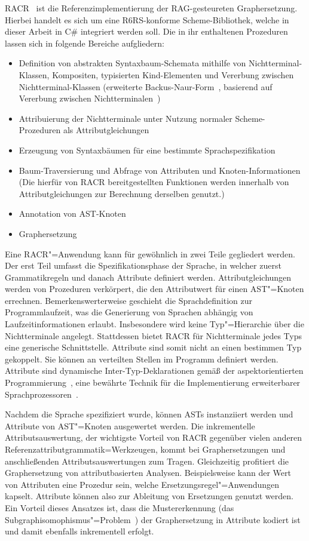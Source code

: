 RACR~\cite{Buerger2012} ist die Referenzimplementierung der RAG-gesteureten Graphersetzung. Hierbei handelt es sich um eine R6RS-konforme Scheme-Bibliothek, welche in dieser Arbeit in C\# integriert werden soll. Die in ihr enthaltenen Prozeduren lassen sich in folgende Bereiche aufgliedern:
\begin{itemize}
	\item Definition von abstrakten Syntaxbaum-Schemata mithilfe von Nichtterminal-Klassen, Kompositen, typisierten Kind-Elementen und Vererbung zwischen Nichtterminal-Klassen (erweiterte Backus-Naur-Form~\cite{Scowen1998}, basierend auf Vererbung zwischen Nichtterminalen~\cite{Hedin1989})
	\item Attribuierung der Nichtterminale unter Nutzung normaler Scheme-Prozeduren als Attributgleichungen
	\item Erzeugung von Syntaxbäumen für eine bestimmte Sprachspezifikation
	\item Baum-Traversierung und Abfrage von Attributen und Knoten-Informationen (Die hierfür von RACR bereitgestellten Funktionen werden innerhalb von Attributgleichungen zur Berechnung derselben genutzt.)
	\item Annotation von AST-Knoten
	\item Graphersetzung
\end{itemize}

Eine RACR"=Anwendung kann für gewöhnlich in zwei Teile gegliedert werden. Der erst Teil umfasst die Spezifikationsphase der Sprache, in welcher zuerst Grammatikregeln und danach Attribute definiert werden. Attributgleichungen werden von Prozeduren verkörpert, die den Attributwert für einen AST"=Knoten errechnen. Bemerkenswerterweise geschieht die Sprachdefinition zur Programmlaufzeit, was die Generierung von Sprachen abhängig von Laufzeitinformationen erlaubt. Insbesondere wird keine Typ"=Hierarchie über die Nichtterminale angelegt. Stattdessen bietet RACR für Nichtterminale jedes Typs eine generische Schnittstelle. Attribute sind somit nicht an einen bestimmen Typ gekoppelt. Sie können an verteilten Stellen im Programm definiert werden. Attribute sind dynamische Inter-Typ-Deklarationen gemäß der aspektorientierten Programmierung~\cite{Avgustinov2008}, eine bewährte Technik für die Implementierung erweiterbarer Sprachprozessoren~\cite{Ekman2006}.

Nachdem die Sprache spezifiziert wurde, können ASTs instanziiert werden und Attribute von AST"=Knoten ausgewertet werden. Die inkrementelle Attributsauswertung, der wichtigste Vorteil von RACR gegenüber vielen anderen Referenzattributgrammatik=Werkzeugen, kommt bei Graphersetzungen und anschließenden Attributsauswertungen zum Tragen. Gleichzeitig profitiert die Graphersetzung von attributbasierten Analysen. Beispielsweise kann der Wert von Attributen eine Prozedur sein, welche Ersetzungsregel"=Anwendungen kapselt. Attribute können also zur Ableitung von Ersetzungen genutzt werden. Ein Vorteil dieses Ansatzes ist, dass die Mustererkennung (das Subgraphisomophismus"=Problem~\cite{Ullmann1976}) der Graphersetzung in Attribute kodiert ist und damit ebenfalls inkrementell erfolgt.


